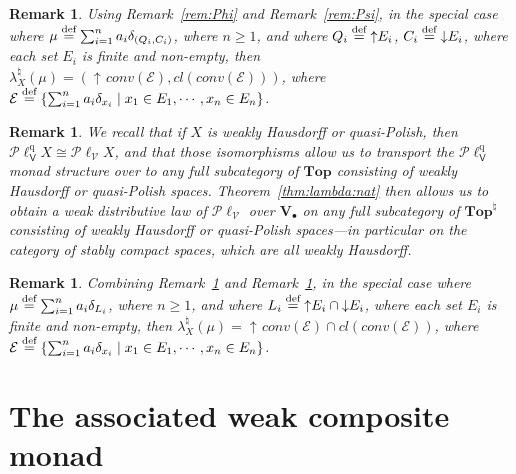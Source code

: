 \documentclass[preprint,12pt]{elsarticle}
\newcommand\eqdef{\mathrel{\buildrel \text{def}\over=}}
\DeclareMathOperator{\upc}{\uparrow\!}
\DeclareMathOperator{\dc}{\downarrow\!}
\newcommand\Vt{\mathsf{V}}
\newcommand\quasi{\mathrm{q}} %
\newcommand\QL{\Plotkin^\quasi}
\newcommand\QLV{\QL_\Vt}
\newcommand\Plotkin{\mathcal P\ell} %
\newcommand\Plotkinn{\Plotkin_{\mathcal V}}
\newcommand\Val{{\mathbf V}}
\newcommand\Topcat{\mathbf{Top}}
\newtheorem{remark}[theorem]{Remark}
\begin{document}
\begin{remark}
  \label{rem:PhiPsi}
  Using Remark~\ref{rem:Phi} and Remark~\ref{rem:Psi}, in the special
  case where $\mu \eqdef \sum_{i=1}^n a_i \delta_{(Q_i, C_i)}$, where
  $n \geq 1$, and where $Q_i \eqdef \upc E_i$, $C_i \eqdef \dc E_i$,
  where each set $E_i$ is finite and non-empty, then
  $\lambda^\natural_X (\mu) = (\upc conv (\mathcal E), cl (conv
  (\mathcal E)))$, where
  $\mathcal E \eqdef \{\sum_{i=1}^n a_i \delta_{x_i} \mid x_1 \in E_1,
  \cdots, x_n \in E_n\}$.
\end{remark}

\begin{remark}
  \label{rem:lambda:nat}
  We recall that if $X$ is weakly Hausdorff or quasi-Polish, then
  $\QLV X \cong \Plotkinn X$, and that those isomorphisms allow us to
  transport the $\QLV$ monad structure over to any full subcategory of
  $\Topcat$ consisting of weakly Hausdorff or quasi-Polish spaces.
  Theorem~\ref{thm:lambda:nat} then allows us to obtain a weak
  distributive law of $\Plotkinn$ over $\Val_\bullet$ on any full
  subcategory of $\Topcat^\natural$ consisting of weakly Hausdorff or
  quasi-Polish spaces---in particular on the category of stably
  compact spaces, which are all weakly Hausdorff.
\end{remark}

\begin{remark}
  \label{rem:PhiPsi:lens}
  Combining Remark~\ref{rem:PhiPsi} and Remark~\ref{rem:lambda:nat},
  in the special case where
  $\mu \eqdef \sum_{i=1}^n a_i \delta_{L_i}$, where $n \geq 1$, and
  where $L_i \eqdef \upc E_i \cap \dc E_i$, where each set $E_i$ is
  finite and non-empty, then
  $\lambda^\natural_X (\mu) = \upc conv (\mathcal E) \cap cl (conv
  (\mathcal E))$, where
  $\mathcal E \eqdef \{\sum_{i=1}^n a_i \delta_{x_i} \mid x_1 \in E_1,
  \cdots, x_n \in E_n\}$.
\end{remark}

\section{The associated weak composite monad}
\label{sec:assoc-weak-comp}
\end{document}
